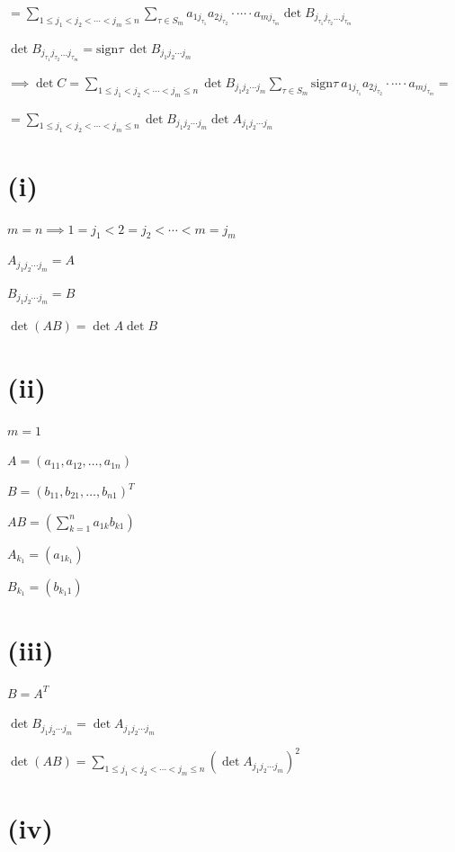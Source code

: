 \documentclass{article}
\begin{document}
\( = \sum_{1\leq j_{1} < j_{2} < \cdots < j_{m} \leq n} \sum_{\tau \in S_{m}} a_{1j_{\tau_{1}}}a_{2j_{\tau_{2}}} \cdot \cdots \cdot a_{mj_{\tau_{m}}} \det B_{j_{\tau_{1}}j_{\tau_{2}}\ldots j_{\tau_{m}}} \)

\( \det B_{j_{\tau_{1}}j_{\tau_{2}}\ldots j_{\tau_{m}}} = \mathrm{sign}\tau\ \det B_{j_{1}j_{2}\cdots j_{m}} \)

\( \implies \det C = \sum_{1\leq j_{1} < j_{2} < \cdots < j_{m} \leq n} \det B_{j_{1}j_{2}\cdots j_{m}} \sum_{\tau \in S_{m}} \mathrm{sign} \tau\ a_{1j_{\tau_{1}}}a_{2j_{\tau_{2}}} \cdot \cdots \cdot a_{mj_{\tau_{m}}} = \)

\( = \sum_{1\leq j_{1} < j_{2} < \cdots < j_{m} \leq n} \det B_{j_{1}j_{2}\cdots j_{m}} \det A_{j_{1}j_{2}\cdots j_{m}} \)

\section*{(i)}

\( m = n \implies 1 = j_{1} < 2=j_{2} < \cdots < m = j_{m} \)

\( A_{j_{1}j_{2}\cdots j_{m}} = A \)

\( B_{j_{1}j_{2}\cdots j_{m}} = B \)

\( \det (AB) = \det A \det B \)

\section*{(ii)}

\( m = 1 \)

\( A = (a_{11}, a_{12}, \ldots, a_{1n}) \)

\( B = {(b_{11}, b_{21}, \ldots, b_{n1})}^{T} \)

\( AB = (\sum_{k=1}^{n} a_{1k}b_{k1}) \)

\( A_{k_{1}} = (a_{1k_{1}}) \)

\( B_{k_{1}} = (b_{k_{1}1}) \)

\section*{(iii)}

\( B = A^{T} \)

\( \det B_{j_{1}j_{2}\cdots j_{m}} = \det A_{j_{1}j_{2}\cdots j_{m}} \)

\( \det(AB) = \sum_{1\leq j_{1} < j_{2} < \cdots < j_{m} \leq n} {(\det A_{j_{1}j_{2}\cdots j_{m}})}^{2} \)

\section*{(iv)}
\end{document}
